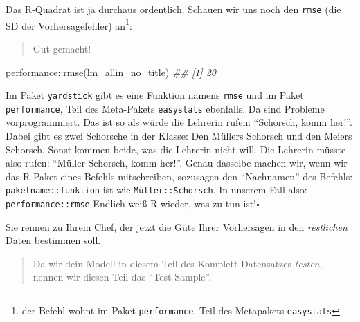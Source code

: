 \documentclass[
  letterpaper,
]{scrbook}
\newenvironment{Shaded}{\begin{snugshade}}{\end{snugshade}}
\newcommand{\DocumentationTok}[1]{\textcolor[rgb]{0.37,0.37,0.37}{\textit{#1}}}
\newcommand{\FunctionTok}[1]{\textcolor[rgb]{0.28,0.35,0.67}{#1}}
\newcommand{\NormalTok}[1]{\textcolor[rgb]{0.00,0.23,0.31}{#1}}
\newcommand{\SpecialCharTok}[1]{\textcolor[rgb]{0.37,0.37,0.37}{#1}}
\theoremstyle{definition}
\theoremstyle{definition}
\theoremstyle{definition}
\theoremstyle{remark}
\begin{document}
Das R-Quadrat ist ja durchaus ordentlich. Schauen wir uns noch den
\texttt{rmse} (die SD der Vorhersagefehler) an\footnote{der Befehl wohnt
  im Paket \texttt{performance}, Teil des Metapakets \texttt{easystats}}:

\begin{quote}
{} Gut gemacht!
\end{quote}

\begin{Shaded}
\begin{Highlighting}[]
\NormalTok{performance}\SpecialCharTok{::}\FunctionTok{rmse}\NormalTok{(lm\_allin\_no\_title)}
\DocumentationTok{\#\# [1] 20}
\end{Highlighting}
\end{Shaded}

\begin{tcolorbox}[enhanced jigsaw, left=2mm, toptitle=1mm, toprule=.15mm, rightrule=.15mm, leftrule=.75mm, breakable, colbacktitle=quarto-callout-caution-color!10!white, colback=white, coltitle=black, bottomtitle=1mm, opacityback=0, title=\textcolor{quarto-callout-caution-color}{\faFire}\hspace{0.5em}{Name Clash}, colframe=quarto-callout-caution-color-frame, arc=.35mm, opacitybacktitle=0.6, bottomrule=.15mm, titlerule=0mm]

Im Paket \texttt{yardstick} gibt es eine Funktion namens \texttt{rmse}
und im Paket \texttt{performance}, Teil des Meta-Pakets
\texttt{easystats} ebenfalls. Da sind Probleme vorprogrammiert. Das ist
so als würde die Lehrerin rufen: ``Schorsch, komm her!''. Dabei gibt es
zwei Schorsche in der Klasse: Den Müllers Schorsch und den Meiers
Schorsch. Sonst kommen beide, was die Lehrerin nicht will. Die Lehrerin
müsste also rufen: ``Müller Schorsch, komm her!''. Genau dasselbe machen
wir, wenn wir das R-Paket eines Befehls mitschreiben, sozusagen den
``Nachnamen'' des Befehls: \texttt{paketname::funktion} ist wie
\texttt{Müller::Schorsch}. In unserem Fall also:
\texttt{performance::rmse} Endlich weiß R wieder, was zu tun
ist!\(\square\)

\end{tcolorbox}

Sie rennen zu Ihrem Chef, der jetzt die Güte Ihrer Vorhersagen in den
\emph{restlichen} Daten bestimmen soll.

\begin{quote}
{} Da wir dein Modell in diesem Teil des
Komplett-Datensatzes \emph{testen}, nennen wir diesen Teil das
``Test-Sample''.
\end{quote}
\end{document}
